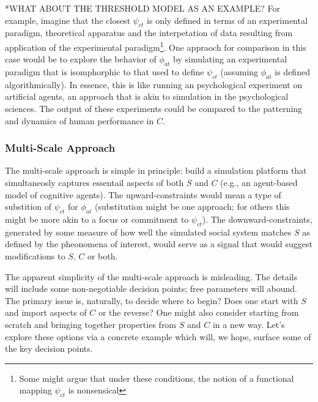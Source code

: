 \documentclass{article}
\begin{document}
*WHAT ABOUT THE THRESHOLD MODEL AS AN EXAMPLE?
For example, imagine that the closest $\psi_{ct}$ is only defined in terms of an experimental paradigm, theoretical apparatus and the interpetation of data resulting from application of the experimental paradigm\footnote{Some might argue that under these conditions, the notion of a functional mapping $\psi_{ct}$ is nonsensical}.  One appraoch for comparison in this case would be to explore the behavior of $\phi_{at}$ by simulating an experimental paradigm that is isomphorphic to that used to define $\psi_{ct}$ (assuming $\phi_{at}$ is defined algorithmically).  In essence, this is like running an psychological experiment on artificial agents, an approach that is akin to simulation in the psychological sciences.  The output of these experiments could be compared to the patterning and dynamics of human performance in $C$.  

 \subsubsection{Multi-Scale Approach}
The multi-scale approach is simple in principle: build a simulation platform that simultaneosly captures essentail aspects of both $S$ and $C$ (e.g., an agent-based model of cognitive agents).  The upward-constraints would mean a type of substition of $\psi_{ct}$ for $\phi_{at}$ (substitution might be one approach; for others this might be more akin to a focus or commitment to $\psi_{ct}$). The downward-constraints, generated by some measure of how well the simulated social system matches $S$ as defined by the pheonomena of interest, would serve as a signal that would suggest modifications to $S$, $C$ or both.  

The apparent simplicity of the multi-scale approach is misleading.  The details will include some non-negotiable decision points; free parameters will abound.  The primary issue is, naturally, to decide where to begin?  Does one start with $S$ and import aspects of $C$ or the reverse?  One might also consider starting from scratch and bringing together properties from $S$ and $C$ in a new way. Let's explore these options via a concrete example which will, we hope, surface some of the key decision points.  
\end{document}
